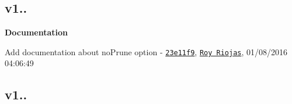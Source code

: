 \subsection*{v1..}


\begin{DoxyItemize}
\item {\bfseries Documentation}
\begin{DoxyItemize}
\item Add documentation about no\+Prune option -\/ \href{https://github.com/royriojas/flat-cache/commit/23e11f9}{\tt 23e11f9}, \href{https://github.com/Roy Riojas}{\tt Roy Riojas}, 01/08/2016 04\+:06\+:49
\end{DoxyItemize}
\end{DoxyItemize}

\subsection*{v1..}


